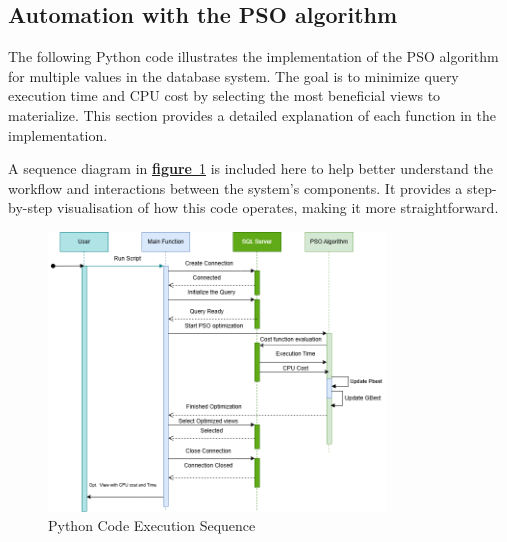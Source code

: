 \subsection{Automation with the PSO algorithm} \label{Cost_evaluation}
 The following Python code illustrates the implementation of the PSO algorithm for multiple values in the database system. The goal is to minimize query execution time and CPU cost by selecting the most beneficial views to materialize. This section provides a detailed explanation of each function in the implementation.\vspace{.4cm}




\vspace{.4cm}

A sequence diagram in \hyperref[fig:Sequence_diagram]{\textbf{figure}~\ref{fig:Sequence_diagram}} is included here to help better understand the workflow and interactions between the system's components. It provides a step-by-step visualisation of how this code operates, making it more straightforward.\vspace{.4cm}
  


\clearpage




\begin{figure}[h]
    \centering
    \includegraphics[width=0.8\textwidth]{Figure/Seq.Dia.png} %
    \caption{Python Code Execution Sequence}
    \label{fig:Sequence_diagram}
\end{figure}\vspace{.4cm}






